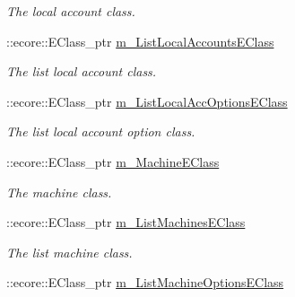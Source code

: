 \begin{DoxyCompactItemize}
\begin{DoxyCompactList}\small\item\em The local account class. \item\end{DoxyCompactList}\item 
\hypertarget{classUMS__Data_1_1UMS__DataPackage_ad0a766f1c3fc97f8c9b5a67d01f8547b}{
::ecore::EClass\_\-ptr \hyperlink{classUMS__Data_1_1UMS__DataPackage_ad0a766f1c3fc97f8c9b5a67d01f8547b}{m\_\-ListLocalAccountsEClass}}
\label{classUMS__Data_1_1UMS__DataPackage_ad0a766f1c3fc97f8c9b5a67d01f8547b}

\begin{DoxyCompactList}\small\item\em The list local account class. \item\end{DoxyCompactList}\item 
\hypertarget{classUMS__Data_1_1UMS__DataPackage_ac4c236d21966b08d7d7f9a444fbe294f}{
::ecore::EClass\_\-ptr \hyperlink{classUMS__Data_1_1UMS__DataPackage_ac4c236d21966b08d7d7f9a444fbe294f}{m\_\-ListLocalAccOptionsEClass}}
\label{classUMS__Data_1_1UMS__DataPackage_ac4c236d21966b08d7d7f9a444fbe294f}

\begin{DoxyCompactList}\small\item\em The list local account option class. \item\end{DoxyCompactList}\item 
\hypertarget{classUMS__Data_1_1UMS__DataPackage_a0bf32bf4a936e4fb95089c27011f9fbc}{
::ecore::EClass\_\-ptr \hyperlink{classUMS__Data_1_1UMS__DataPackage_a0bf32bf4a936e4fb95089c27011f9fbc}{m\_\-MachineEClass}}
\label{classUMS__Data_1_1UMS__DataPackage_a0bf32bf4a936e4fb95089c27011f9fbc}

\begin{DoxyCompactList}\small\item\em The machine class. \item\end{DoxyCompactList}\item 
\hypertarget{classUMS__Data_1_1UMS__DataPackage_a2c50a52934b9895a316c6c58dfcc7e79}{
::ecore::EClass\_\-ptr \hyperlink{classUMS__Data_1_1UMS__DataPackage_a2c50a52934b9895a316c6c58dfcc7e79}{m\_\-ListMachinesEClass}}
\label{classUMS__Data_1_1UMS__DataPackage_a2c50a52934b9895a316c6c58dfcc7e79}

\begin{DoxyCompactList}\small\item\em The list machine class. \item\end{DoxyCompactList}\item 
\hypertarget{classUMS__Data_1_1UMS__DataPackage_a891562f9cb6f021a486d70f07886b459}{
::ecore::EClass\_\-ptr \hyperlink{classUMS__Data_1_1UMS__DataPackage_a891562f9cb6f021a486d70f07886b459}{m\_\-ListMachineOptionsEClass}}
\label{classUMS__Data_1_1UMS__DataPackage_a891562f9cb6f021a486d70f07886b459}


\end{DoxyCompactItemize}
